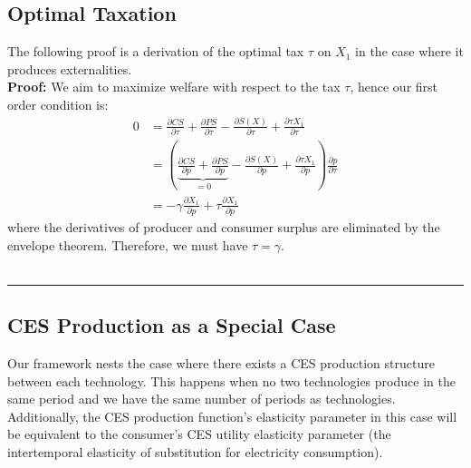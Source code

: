 \documentclass[11pt,a4paper]{extarticle}
\newenvironment{proof}[1][Proof]{\noindent\textbf{#1:} }{\ \rule{0.5em}{0.5em}}
\begin{document}
\subsection{Optimal Taxation}

The following proof is a derivation of the optimal tax $\tau$ on $X_1$ in the case where it produces externalities. 
\hfill \\
\begin{proof} We aim to maximize welfare with respect to the tax $\tau$, hence our first order condition is:
	\begin{align*}
	0 &= \frac{\partial CS}{\partial \tau} + \frac{\partial PS}{\partial \tau} - \frac{\partial S(X)}{\partial \tau} + \frac{\partial \tau X_1}{\partial \tau} \\
	&=  \left( \underbrace{\frac{\partial CS}{\partial p}  + \frac{\partial PS}{\partial p}}_{= 0} - \frac{ \partial  S(X)}{\partial p} + \frac{\partial \tau X_1}{\partial p} \right) \frac{\partial p}{\partial \tau} \\
	&=  - \gamma \frac{\partial  X_1}{\partial p} + \tau \frac{\partial  X_1}{\partial p}
	\end{align*}
	where the derivatives of producer and consumer surplus are eliminated by the envelope theorem. Therefore, we must have $\tau = \gamma$. \\
	\hfill
\end{proof}

\subsection{CES Production as a Special Case}

\label{sec:CESspecialcase}

Our framework nests the case where there exists a CES production structure between each technology. This happens when no two technologies produce in the same period and we have the same number of periods as technologies. Additionally, the CES production function's elasticity parameter in this case will be equivalent to the consumer's CES utility elasticity parameter (the intertemporal elasticity of substitution for electricity consumption). 
\end{document}
